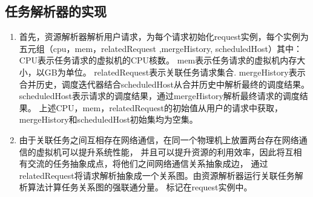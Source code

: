 \subsection{任务解析器的实现}
\begin{enumerate}
\item 首先，资源解析器解析用户请求，为每个请求初始化request实例，每个实例为五元组（cpu，mem，relatedRequest ,mergeHistory, scheduledHost）其中：
CPU表示任务请求的虚拟机的CPU核数。
mem表示任务请求的虚拟机内存大小，以GB为单位。
relatedRequest表示关联任务请求集合.
mergeHistory表示合并历史，调度迭代器结合scheduledHost从合并历史中解析最终的调度结果。
scheduledHost表示请求的调度结果，通过mergeHistory解析最终请求的调度结果。
上述CPU，mem，relatedRequest的初始值从用户的请求中获取，mergeHistory和scheduledHost初始集均为空集。

\item 由于关联任务之间互相存在网络通信，在同一个物理机上放置两台存在网络通信的虚拟机可以提升系统性能，
并且可以提升资源的利用效率，因此将互相有交流的任务抽象成点，将他们之间网络通信关系抽象成边，
通过relatedRequest将请求解析抽象成一个关系图。由资源解析器运行关联任务解析算法计算任务关系图的强联通分量。
标记在request实例中。
\end{enumerate}


